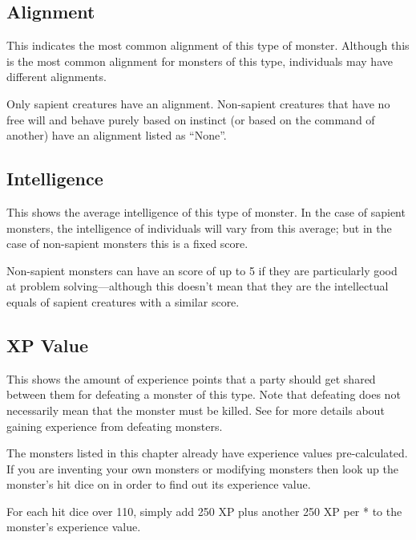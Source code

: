 \begin{multicols*}{2}
\subsection{Alignment}
This indicates the most common alignment of this type of monster. Although this is the most common alignment for monsters of this type, individuals may have different alignments.

Only sapient creatures have an alignment. Non-sapient creatures that have no free will and behave purely based on instinct (or based on the command of another) have an alignment listed as “None”.

\subsection{Intelligence}
This shows the average intelligence of this type of monster. In the case of sapient monsters, the intelligence of individuals will vary from this average; but in the case of non-sapient monsters this is a fixed score.

Non-sapient monsters can have an  score of up to 5 if they are particularly good at problem solving—although this doesn’t mean that they are the intellectual equals of sapient creatures with a similar score.

\subsection{XP Value}
This shows the amount of experience points that a party should get shared between them for defeating a monster of this type. Note that defeating does not necessarily mean that the monster must be killed. See  for more details about gaining experience from defeating monsters.

The monsters listed in this chapter already have experience values pre-calculated. If you are inventing your own monsters or modifying monsters then look up the monster’s hit dice on  in order to find out its experience value.

For each hit dice over 110, simply add 250 XP plus another 250 XP per * to the monster’s experience value.

\end{multicols*}
